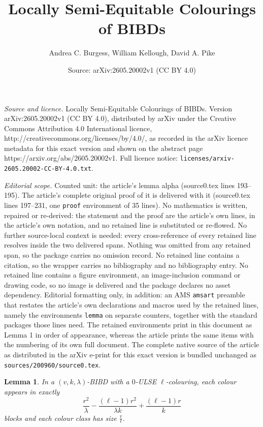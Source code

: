 \documentclass[10pt,a4paper]{amsart}
\title{Locally Semi-Equitable Colourings of BIBDs}
\author{Andrea C. Burgess, William Kellough, David A. Pike}
\date{Source: arXiv:2605.20002v1 (CC BY 4.0)}
\newtheorem{lemma}{Lemma}
\begin{document}
\maketitle

\noindent\emph{Source and licence.} Locally Semi-Equitable Colourings of BIBDs. Version arXiv:2605.20002v1 (CC BY 4.0), distributed by arXiv under the Creative Commons Attribution 4.0 International licence, http://creativecommons.org/licenses/by/4.0/, as recorded in the arXiv licence metadata for this exact version and shown on the abstract page https://arxiv.org/abs/2605.20002v1. Full licence notice: \texttt{licenses/arxiv-2605.20002-CC-BY-4.0.txt}.\par\smallskip

\noindent\textit{Editorial scope.} Counted unit: the article's lemma alpha (source0.tex lines 193--195). The article's complete original proof of it is delivered with it (source0.tex lines 197--231, one \texttt{proof} environment of 35 lines). No mathematics is written, repaired or re-derived: the statement and the proof are the article's own lines, in the article's own notation, and no retained line is substituted or re-flowed.  No further source-local context is needed: every cross-reference of every retained line resolves inside the two delivered spans.  Nothing was omitted from any retained span, so the package carries no omission record.  No retained line contains a citation, so the wrapper carries no bibliography and no bibliography entry.  No retained line contains a figure environment, an image-inclusion command or drawing code, so no image is delivered and the package declares no asset dependency.  Editorial formatting only, in addition: an AMS \texttt{amsart} preamble that restates the article's own declarations and macros used by the retained lines, namely the environments \texttt{lemma} on separate counters, together with the standard packages those lines need.  The retained environments print in this document as Lemma 1 in order of appearance, whereas the article prints the same items with the numbering of its own full document.  The complete native source of the article as distributed in the arXiv e-print for this exact version is bundled unchanged as \texttt{sources/200960/source0.tex}.
\begin{lemma}\label{lem: l-1 divides k, colour classes the same size, calculating alpha}
    In a $(v,k,\lambda)$-BIBD with a $0$-ULSE $\ell$-colouring, each colour appears in exactly \[\frac{r^2}{\lambda} - \frac{(\ell - 1) r^2}{\lambda k} + \frac{(\ell - 1)r}{k}\] blocks and each colour class has size $\frac{v}{\ell}$.
\end{lemma}
\end{document}
